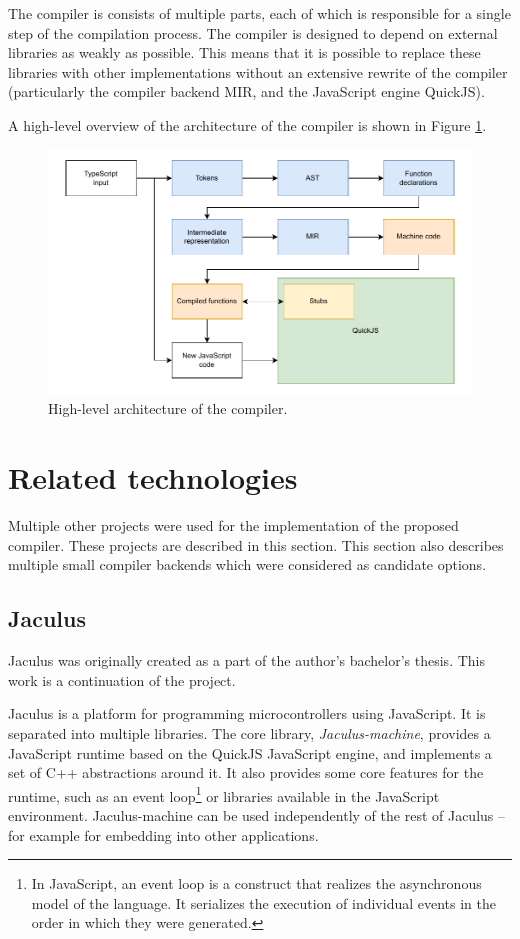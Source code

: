 The compiler is consists of multiple parts, each of which is responsible for a single step of the compilation process. The compiler is designed to depend on external libraries as weakly as possible. This means that it is possible to replace these libraries with other implementations without an extensive rewrite of the compiler (particularly the compiler backend MIR, and the JavaScript engine QuickJS).

A high-level overview of the architecture of the compiler is shown in Figure \ref{fig:architecture}.

\begin{figure}
    \centering
    \includegraphics[width=\textwidth, draft=false]{assets/architecture.pdf}
    \caption{High-level architecture of the compiler.}
    \label{fig:architecture}
\end{figure}

\section{Related technologies}

Multiple other projects were used for the implementation of the proposed compiler. These projects are described in this section. This section also describes multiple small compiler backends which were considered as candidate options.

\subsection{Jaculus}\label{jaculus}

Jaculus was originally created as a part of the author's bachelor's thesis\cite{jaculusthesis}. This work is a continuation of the project.

Jaculus is a platform for programming microcontrollers using JavaScript. It is separated into multiple libraries. The core library, \textit{Jaculus-machine}, provides a JavaScript runtime based on the QuickJS JavaScript engine\cite{quickjs}, and implements a set of C++ abstractions around it. It also provides some core features for the runtime, such as an event loop\footnote{In JavaScript, an event loop is a construct that realizes the asynchronous model of the language. It serializes the execution of individual events in the order in which they were generated.} or libraries available in the JavaScript environment. Jaculus-machine can be used independently of the rest of Jaculus -- for example for embedding into other applications.


